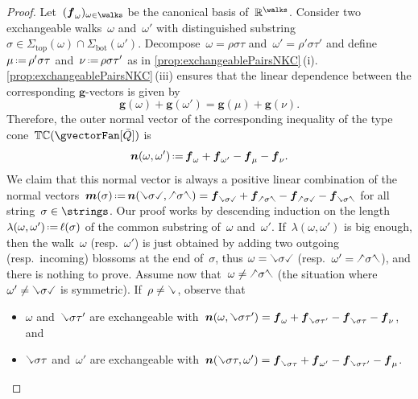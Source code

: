 \documentclass{amsart}
\theoremstyle{definition}
\newcommand{\R}{\mathbb{R}} %
\renewcommand{\b}[1]{{\boldsymbol{#1}}} %
\newcommand{\eqdef}{\mbox{\,\raisebox{0.2ex}{\scriptsize\ensuremath{\mathrm:}}\ensuremath{=}\,}} %
\newcommand{\gvector}[1]{\b{g}(#1)} %
\newcommand{\typeCone}{\mathbb{TC}} %
\newcommand{\quiver}{\bar Q} %
\renewcommand{\top}{\mathrm{top}} %
\newcommand{\bottom}{\mathrm{bot}} %
\newcommand{\hL}{\text{\rotatebox[origin=c]{180}{\checked}}}
\newcommand{\hR}{\text{\rotatebox[origin=c]{180}{\reflectbox{\checked}}}}
\newcommand{\cL}{\text{\reflectbox{\checked}}}
\newcommand{\cR}{\text{\checked}}
\newcommand{\hh}[1]{\hL#1\hR} %
\newcommand{\cc}[1]{\cL#1\cR} %
\newcommand{\hc}[1]{\hL#1\cR} %
\newcommand{\ch}[1]{\cL#1\hR} %
\begin{document}
\begin{proof}
Let~$(\b{f}_\omega)_{\omega \in \walks}$ be the canonical basis of~$\R^{\walks}$.
Consider two exchangeable walks~$\omega$ and~$\omega'$ with distinguished substring~$\sigma \in \Sigma_\top(\omega) \cap \Sigma_\bottom(\omega')$.
Decompose~$\omega = \rho \sigma \tau$ and~$\omega' = \rho' \sigma \tau'$ and define~$\mu \eqdef \rho' \sigma \tau$ and~$\nu \eqdef \rho \sigma \tau'$ as in \cref{prop:exchangeablePairsNKC}\,(i). \cref{prop:exchangeablePairsNKC}\,(iii) ensures that the linear dependence between the corresponding $\b{g}$-vectors is given by
\[
\gvector{\omega} + \gvector{\omega'} = \gvector{\mu} + \gvector{\nu}.
\]
Therefore, the outer normal vector of the corresponding inequality of the type cone~$\typeCone(\gvectorFan[\quiver])$ is
\[
\b{n}(\omega, \omega') \eqdef \b{f}_\omega + \b{f}_{\omega'} - \b{f}_\mu - \b{f}_\nu.
\]
We claim that this normal vector is always a positive linear combination of the normal vectors~$\b{m}(\sigma) \eqdef \b{n}(\cc{\sigma}, \hh{\sigma}) = \b{f}_{\cc{\sigma}} + \b{f}_{\hh{\sigma}} - \b{f}_{\hc{\sigma}} - \b{f}_{\ch{\sigma}}$ for all string~$\sigma \in \strings$.
Our proof works by descending induction on the length~$\lambda(\omega,\omega') \eqdef \ell(\sigma)$ of the common substring of~$\omega$ and~$\omega'$.
If~$\lambda(\omega, \omega')$ is big enough, then the walk~$\omega$ (resp.~$\omega'$) is just obtained by adding two outgoing (resp.~incoming) blossoms at the end of~$\sigma$, thus $\omega = \cc{\sigma}$ (resp.~$\omega' = \hh{\sigma}$), and there is nothing to prove.
Assume now that~$\omega \ne \hh{\sigma}$ (the situation where~$\omega' \ne \cc{\sigma}$ is symmetric).
If~$\rho \ne \cL$, observe that
\begin{itemize}
\item $\omega$ and~$\cL \sigma \tau'$ are exchangeable with~$\b{n}(\omega, \cL \sigma \tau') = \b{f}_\omega + \b{f}_{\cL \sigma \tau'} - \b{f}_{\cL \sigma \tau} - \b{f}_\nu$, and
\item $\cL \sigma \tau$ and~$\omega'$ are exchangeable with~$\b{n}(\cL \sigma \tau, \omega') = \b{f}_{\cL \sigma \tau} + \b{f}_{\omega'} - \b{f}_{\cL \sigma \tau'} - \b{f}_\mu$.
\end{itemize}

\end{proof}
\end{document}
